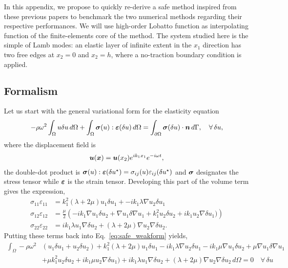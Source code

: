 In this appendix, we propose to quickly re-derive a \acrshort{safe} method inspired from these previous papers to benchmark the two numerical methods regarding their respective performances. We will use high-order Lobatto function as interpolating function of the finite-elements core of the method. The system studied here is the simple of Lamb modes: an elastic layer of infinite extent in the $x_1$ direction has two free edges at $x_2=0$ and $x_2=h$, where a no-traction boundary condition is applied.

\subsection{Formalism}
Let us start with the general variational form for the elasticity equation
\begin{equation}
    - \rho \omega^2 \int_\Omega u \delta u \,d\Omega+ \int_\Omega \boldsymbol \sigma (u) : \boldsymbol \varepsilon (\delta u) \,d\Omega = \int_{\partial \Omega} \boldsymbol \sigma (\delta u) \cdot \boldsymbol n \,d\Gamma, \quad \forall \,  \delta u,
    \label{eq:safe_weakform}
\end{equation}
where the displacement field is
\begin{equation}
    \boldsymbol u (\boldsymbol x) = \boldsymbol u(x_2) e^{ik_1 x_1}e^{-i\omega t},
\end{equation} the double-dot product is $\boldsymbol \sigma (u) : \boldsymbol \varepsilon (\delta u ^\star) = \sigma_{ij}(u) \varepsilon_{ij}(\delta u ^\star)$ and $\boldsymbol \sigma$ designates the stress tensor while $\boldsymbol \varepsilon$ is the strain tensor. Developing this part of the volume term gives the expression,
\begin{equation}
    \begin{aligned}
        \sigma_{11}\varepsilon_{11} &= k_1^2 (\lambda + 2\mu) u_1 \delta u_1 + - ik_1 \lambda \nabla u_2 \delta u_1 \\
        \sigma_{12}\varepsilon_{12} &= \frac \mu 2 \left(-ik_1 \nabla u_1 \delta u_2 + \nabla u_1 \delta \nabla u_1 + k_1^2 u_2\delta u_2 + ik_1 u_2 \nabla \delta u_1)\right) \\
        \sigma_{22}\varepsilon_{22} &= ik_1 \lambda u_1 \nabla \delta u_2 + (\lambda + 2\mu) \nabla u_2 \nabla \delta u_2.
    \end{aligned}
\end{equation}
Putting these terms back into Eq.~\ref{eq:safe_weakform} yields,
\begin{equation}
    \begin{aligned}
        \int_\Omega - \rho \omega^2 &\left(u_1 \delta u_1 + u_2 \delta u_2 \right) + k_1^2 (\lambda + 2\mu) u_1 \delta u_1 - ik_1 \lambda \nabla u_2 \delta u_1 -ik_1 \mu \nabla u_1 \delta u_2 + \mu \nabla u_1 \delta \nabla u_1 \\ &+ \mu k_1^2 u_2\delta u_2 + ik_1 \mu u_2 \nabla \delta u_1) + ik_1 \lambda u_1 \nabla \delta u_2 + (\lambda + 2\mu) \nabla u_2 \nabla \delta u_2 \,d\Omega =0 \quad \forall \, \delta u
    \end{aligned}
    \label{eq:safe_rearranged_weak}
\end{equation}
